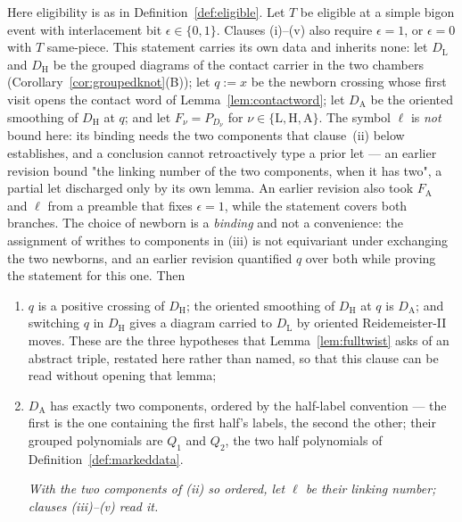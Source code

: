 \begin{lemma}
\label{lem:triplebridge}
Here eligibility is as in Definition~\ref{def:eligible}.
Let $T$ be eligible at a simple bigon event with interlacement bit $\epsilon\in\{0,1\}$.
Clauses (i)--(v) also require $\epsilon=1$, or $\epsilon=0$ with $T$ same-piece. This statement
carries its own data and inherits none: let $D_{\mathrm L}$ and $D_{\mathrm H}$
be the grouped diagrams of the contact carrier in the two chambers
(Corollary~\ref{cor:groupedknot}(B)); let $q:=x$ be the newborn crossing whose
first visit opens the contact word of Lemma~\ref{lem:contactword}; let
$D_{\mathrm A}$ be the oriented smoothing of $D_{\mathrm H}$ at $q$; and let
$F_\nu=P_{D_\nu}$ for $\nu\in\{\mathrm L,\mathrm H,\mathrm A\}$. The symbol
$\ell$ is \emph{not} bound here: its binding needs the two components that
clause~(ii) below establishes, and a conclusion cannot retroactively type a
prior let --- an earlier revision bound "the linking number of the two
components, when it has two", a partial let discharged only by its own lemma.
An earlier revision also took $F_{\mathrm A}$ and $\ell$ from a preamble that
fixes $\epsilon=1$, while the statement covers both branches. The choice of newborn is a \emph{binding} and not a
convenience: the assignment of writhes to components in (iii) is not equivariant
under exchanging the two newborns, and an earlier revision quantified $q$ over
both while proving the statement for this one. Then
\begin{enumerate}
\item[(i)] $q$ is a positive crossing of $D_{\mathrm H}$; the oriented smoothing
of $D_{\mathrm H}$ at $q$ is $D_{\mathrm A}$; and switching $q$ in
$D_{\mathrm H}$ gives a diagram carried to $D_{\mathrm L}$ by oriented
Reidemeister-II moves. These are the three hypotheses that
Lemma~\ref{lem:fulltwist} asks of an abstract triple, restated here rather than
named, so that this clause can be read without opening that lemma;
\item[(ii)] $D_{\mathrm A}$ has exactly two components, ordered by the
half-label convention --- the first is the one containing the first half's
labels, the second the other; their grouped polynomials are $Q_1$ and $Q_2$,
the two half polynomials of Definition~\ref{def:markeddata}.

\emph{With the two components of (ii) so ordered, let $\ell$ be their linking
number; clauses (iii)--(v) read it.}


\end{enumerate}
\end{lemma}
